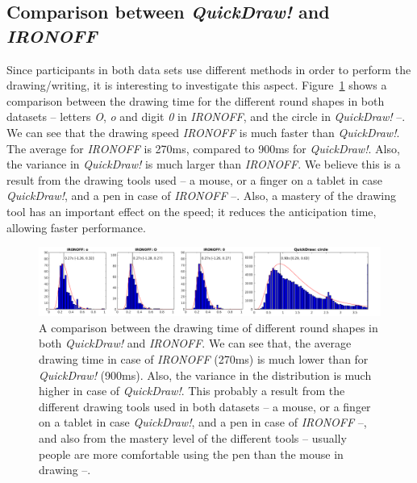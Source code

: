 
\subsection{Comparison between \textit{QuickDraw!} and \textit{IRONOFF}}
\par Since participants in both data sets use different methods in order to perform the drawing/writing, it is interesting to investigate this aspect. Figure~\ref{fig:ironoff_quickdraw_connection} shows a comparison between the drawing time for the different round shapes in both datasets -- letters \textit{O}, \textit{o} and digit \textit{0} in \textit{IRONOFF}, and the circle in \textit{QuickDraw!} --. We can see that the drawing speed \textit{IRONOFF} is much faster than \textit{QuickDraw!}. The average for \textit{IRONOFF} is 270ms, compared to 900ms for \textit{QuickDraw!}. Also, the variance in \textit{QuickDraw!} is much larger than \textit{IRONOFF}. We believe this is a result from the drawing tools used -- a mouse, or a finger on a tablet in case \textit{QuickDraw!}, and a pen in case of \textit{IRONOFF} --. Also, a mastery of the drawing tool has an important effect on the speed; it reduces the anticipation time, allowing faster performance.

\begin{figure}
    \centering
    \includegraphics[scale=0.6]{images/dataset/cmp_rond.png}
    \caption{A comparison between the drawing time of different round shapes in both \textit{QuickDraw!} and \textit{IRONOFF}. We can see that, the average drawing time in case of \textit{IRONOFF} (270ms) is much lower than for \textit{QuickDraw!} (900ms). Also, the variance in the distribution is much higher in case of \textit{QuickDraw!}. This probably a result from the different drawing tools used in both datasets -- a mouse, or a finger on a tablet in case \textit{QuickDraw!}, and a pen in case of \textit{IRONOFF} --, and also from the mastery level of the different tools -- usually people are more comfortable using the pen than the mouse in drawing --.}
    \label{fig:ironoff_quickdraw_connection}
\end{figure}

